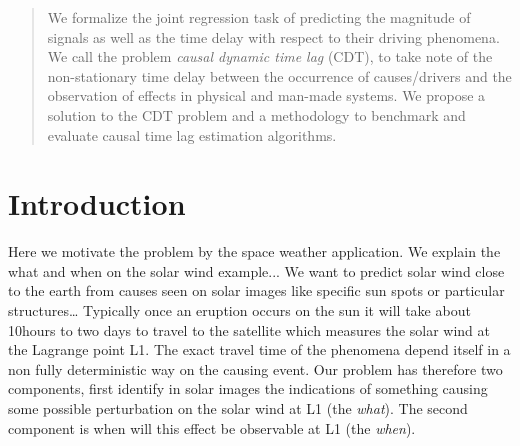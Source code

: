 \documentclass[twoside]{article}
\begin{document}
%

%


\begin{abstract}
  We formalize the joint regression task of predicting the magnitude of signals as well as the time delay with respect to their driving phenomena. We call the problem \emph{causal dynamic time lag} (CDT), to take note of the non-stationary time delay between the occurrence of causes/drivers and the observation of effects in physical and man-made systems. We propose a solution to the CDT problem and a methodology to benchmark and evaluate causal time lag estimation algorithms.
\end{abstract}

\section{Introduction}

Here we motivate the problem by the space weather application. We explain the what and when on the solar wind example... We want to predict solar wind close to the earth from causes seen on solar images like specific sun spots or particular structures\ldots
Typically once an eruption occurs on the sun it will take about 10hours to two days to travel to the satellite which measures the solar wind at the Lagrange point L1. The exact travel time of the phenomena depend itself in a non fully 
deterministic way on the causing event. Our problem has therefore two components, first identify in solar images the indications of something causing some possible perturbation on the solar wind at L1 (the \emph{what}). The second component is when will this effect be observable at L1 (the \emph{when}). 
\end{document}
